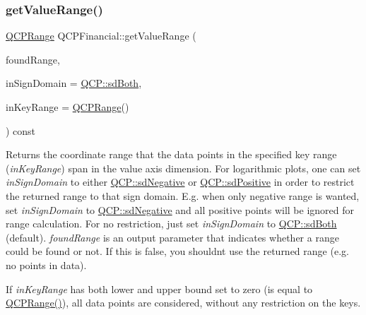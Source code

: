 \subsubsection{\texorpdfstring{get\+Value\+Range()}{getValueRange()}\hspace{0.1cm}{\footnotesize\ttfamily [1/2]}}
{\footnotesize\ttfamily \hyperlink{class_q_c_p_range}{Q\+C\+P\+Range} Q\+C\+P\+Financial\+::get\+Value\+Range (\begin{DoxyParamCaption}\item[{bool \&}]{found\+Range,  }\item[{\hyperlink{namespace_q_c_p_afd50e7cf431af385614987d8553ff8a9}{Q\+C\+P\+::\+Sign\+Domain}}]{in\+Sign\+Domain = {\ttfamily \hyperlink{namespace_q_c_p_afd50e7cf431af385614987d8553ff8a9a3dee7e9cd2fedce9253b83e172626a6c}{Q\+C\+P\+::sd\+Both}},  }\item[{const \hyperlink{class_q_c_p_range}{Q\+C\+P\+Range} \&}]{in\+Key\+Range = {\ttfamily \hyperlink{class_q_c_p_range}{Q\+C\+P\+Range}()} }\end{DoxyParamCaption}) const\hspace{0.3cm}{\ttfamily [virtual]}}

Returns the coordinate range that the data points in the specified key range ({\itshape in\+Key\+Range}) span in the value axis dimension. For logarithmic plots, one can set {\itshape in\+Sign\+Domain} to either \hyperlink{namespace_q_c_p_afd50e7cf431af385614987d8553ff8a9a0b464fa3135be2808909739a969193c9}{Q\+C\+P\+::sd\+Negative} or \hyperlink{namespace_q_c_p_afd50e7cf431af385614987d8553ff8a9a23362334a52289677a51526a9b68db6c}{Q\+C\+P\+::sd\+Positive} in order to restrict the returned range to that sign domain. E.\+g. when only negative range is wanted, set {\itshape in\+Sign\+Domain} to \hyperlink{namespace_q_c_p_afd50e7cf431af385614987d8553ff8a9a0b464fa3135be2808909739a969193c9}{Q\+C\+P\+::sd\+Negative} and all positive points will be ignored for range calculation. For no restriction, just set {\itshape in\+Sign\+Domain} to \hyperlink{namespace_q_c_p_afd50e7cf431af385614987d8553ff8a9a3dee7e9cd2fedce9253b83e172626a6c}{Q\+C\+P\+::sd\+Both} (default). {\itshape found\+Range} is an output parameter that indicates whether a range could be found or not. If this is false, you shouldn\textquotesingle{}t use the returned range (e.\+g. no points in data).

If {\itshape in\+Key\+Range} has both lower and upper bound set to zero (is equal to {\ttfamily \hyperlink{class_q_c_p_range}{Q\+C\+P\+Range()}}), all data points are considered, without any restriction on the keys.

